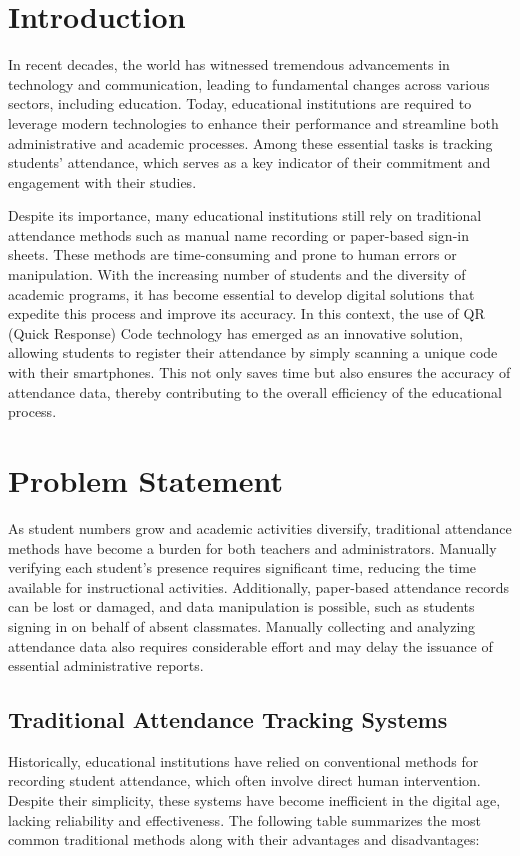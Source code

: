 \documentclass[12pt,a4paper]{report}
\begin{document}
\section{Introduction}

\indent In recent decades, the world has witnessed tremendous advancements in technology and communication, leading to fundamental changes across various sectors, including education. Today, educational institutions are required to leverage modern technologies to enhance their performance and streamline both administrative and academic processes. Among these essential tasks is tracking students' attendance, which serves as a key indicator of their commitment and engagement with their studies.

Despite its importance, many educational institutions still rely on traditional attendance methods such as manual name recording or paper-based sign-in sheets. These methods are time-consuming and prone to human errors or manipulation. With the increasing number of students and the diversity of academic programs, it has become essential to develop digital solutions that expedite this process and improve its accuracy. In this context, the use of QR (Quick Response) Code technology has emerged as an innovative solution, allowing students to register their attendance by simply scanning a unique code with their smartphones. This not only saves time but also ensures the accuracy of attendance data, thereby contributing to the overall efficiency of the educational process.

\section{Problem Statement}
As student numbers grow and academic activities diversify, traditional attendance methods have become a burden for both teachers and administrators. Manually verifying each student's presence requires significant time, reducing the time available for instructional activities. Additionally, paper-based attendance records can be lost or damaged, and data manipulation is possible, such as students signing in on behalf of absent classmates. Manually collecting and analyzing attendance data also requires considerable effort and may delay the issuance of essential administrative reports.


\subsection{Traditional Attendance Tracking Systems}
Historically, educational institutions have relied on conventional methods for recording student attendance, which often involve direct human intervention. Despite their simplicity, these systems have become inefficient in the digital age, lacking reliability and effectiveness. The following table summarizes the most common traditional methods along with their advantages and disadvantages:
\end{document}
